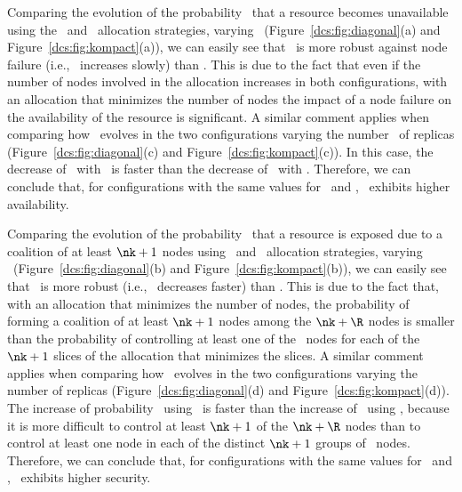 {Comparing the evolution of the probability \PF\ that a resource
becomes unavailable using the \diagonal\ and \compact\ allocation
strategies, varying \nk\ (Figure~\ref{dcs:fig:diagonal}(a) and
Figure~\ref{dcs:fig:kompact}(a)), we can easily see that \diagonal\ is
more robust against node failure (i.e., \PF\ increases slowly) than
\compact. This is due to the fact that even if the number of nodes
involved in the allocation increases in both configurations, with an
allocation that minimizes the number of nodes the impact of a node
failure on the availability of the resource is significant. A similar
comment applies when comparing how \PF\ evolves in the two
configurations varying the number \nr\ of replicas
(Figure~\ref{dcs:fig:diagonal}(c) and Figure~\ref{dcs:fig:kompact}(c)). In
this case, the decrease of \PF\ with \diagonal\ is faster than the
decrease of \PF\ with \compact. Therefore, we can conclude that, for
configurations with the same values for \R\ and \K,
\diagonal\ exhibits higher availability.

Comparing the evolution of the probability \PC\ that a resource is
exposed due to a coalition of at least $\nk+1$ nodes using
\diagonal\ and \compact\ allocation strategies, varying
\nk\ (Figure~\ref{dcs:fig:diagonal}(b) and Figure~\ref{dcs:fig:kompact}(b)),
we can easily see that \compact\ is more robust (i.e., \PC\ decreases
faster) than \diagonal. This is due to the fact that, with an
allocation that minimizes the number of nodes, the probability of
forming a coalition of at least $\nk+1$ nodes among the $\nk+\R$ nodes
is smaller than the probability of controlling at least one of the
\R\ nodes for each of the $\nk+1$ slices of the allocation that
minimizes the slices. A similar comment applies when comparing how
\PC\ evolves in the two configurations varying the number of replicas
(Figure~\ref{dcs:fig:diagonal}(d) and Figure~\ref{dcs:fig:kompact}(d)). The
increase of probability \PC\ using \diagonal\ is faster than the
increase of \PC\ using \compact, because it is more difficult to
control at least $\nk+1$ of the $\nk+\R$ nodes than to control at
least one node in each of the distinct $\nk+1$ groups of
\R\ nodes. Therefore, we can conclude that, for configurations with
the same values for \R\ and \K, \compact\ exhibits higher security.


}
